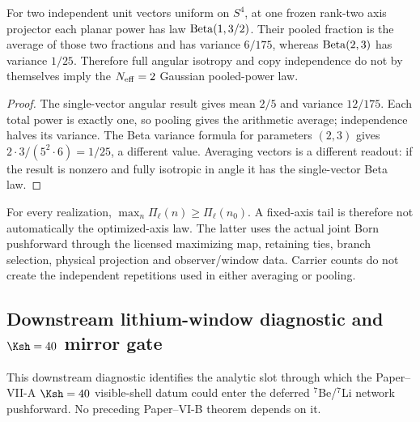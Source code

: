 \documentclass[12pt,a4paper]{article}
\begin{document}
\begin{proposition}
\label{p8:prop:v2187-fixed-radius-pooling-diagnostic}
For two independent unit vectors uniform on $S^4$, at one frozen rank-two
axis projector each planar power has law ${\rm Beta}(1,3/2)$.
Their pooled fraction is the average of those two fractions and has variance
$6/175$, whereas ${\rm Beta}(2,3)$ has variance $1/25$.
Therefore full angular isotropy and copy independence do not by themselves
imply the $N_{\rm eff}=2$ Gaussian pooled-power law.
\end{proposition}
\begin{proof}
The single-vector angular result gives mean $2/5$ and variance $12/175$.
Each total power is exactly one, so pooling gives the arithmetic average;
independence halves its variance.  The Beta variance formula for parameters
$(2,3)$ gives $2\cdot3/(5^2\cdot6)=1/25$, a different value.
Averaging vectors is a different readout: if the result is nonzero and fully
isotropic in angle it has the single-vector Beta law.
\end{proof}

For every realization, $\max_n\Pi_\ell(n)\ge\Pi_\ell(n_0)$.
A fixed-axis tail is therefore not automatically the optimized-axis law.
The latter uses the actual joint Born pushforward through the licensed
maximizing map, retaining ties, branch selection, physical projection and
observer/window data.  Carrier counts do not create the independent
repetitions used in either averaging or pooling.




\subsection{\texorpdfstring{Downstream lithium-window diagnostic and \(\Ksh=40\) mirror gate}{Downstream lithium-window diagnostic and K=40 mirror gate}}
\label{p9:app:lithium-k40-mirror-gate}

This downstream diagnostic identifies the analytic slot through which the Paper--VII-A \(\Ksh=40\) visible-shell datum could enter the deferred \({}^7\)Be/\({}^7\)Li network pushforward.  No preceding Paper--VI-B theorem depends on it.
\end{document}
